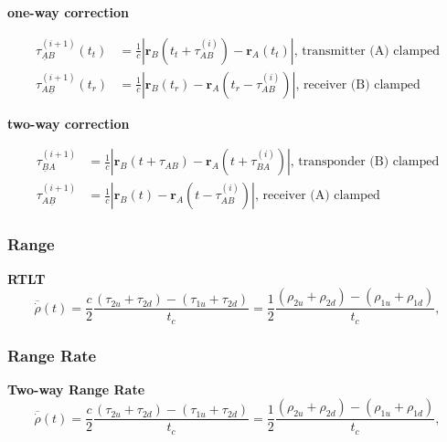 \textbf{one-way correction}

\begin{equation}
    \begin{aligned}
        \tau_{\underline{A}B}^{(i+1)}(t_t) &= \frac{1}{c}|\bm{r}_B(t_t+\tau_{AB}^{(i)})-\bm{r}_A(t_t)|\text{, transmitter (A) clamped} \\
        \tau_{A\underline{B}}^{(i+1)}(t_r) &= \frac{1}{c}|\bm{r}_B(t_r)-\bm{r}_A(t_r-\tau_{AB}^{(i)})|\text{, receiver (B) clamped}
    \end{aligned}
\end{equation}

\textbf{two-way correction}

\begin{equation}
    \begin{aligned}
        \tau_{\underline{B}A}^{(i+1)} &= \frac{1}{c}|\bm{r}_B(t+\tau_{AB})-\bm{r}_A(t+\tau_{BA}^{(i)})|\text{, transponder (B) clamped} \\
        \tau_{A\underline{B}}^{(i+1)} &= \frac{1}{c}|\bm{r}_B(t)-\bm{r}_A(t-\tau_{AB}^{(i)})|\text{, receiver (A) clamped}
    \end{aligned}
\end{equation}

\subsubsection{Range}

\textbf{RTLT}
\begin{equation}
    \overline{\dot{\rho}}(t) = \frac{c}{2}\frac{(\tau_{2u}+\tau_{2d})-(\tau_{1u}+\tau_{2d})}{t_c} = \frac{1}{2}\frac{(\rho_{2u}+\rho_{2d})-(\rho_{1u} + \rho_{1d})}{t_c},
\end{equation}


\subsubsection{Range Rate}

\textbf{Two-way Range Rate}
\begin{equation}
    \overline{\dot{\rho}}(t) = \frac{c}{2}\frac{(\tau_{2u}+\tau_{2d})-(\tau_{1u}+\tau_{2d})}{t_c} = \frac{1}{2}\frac{(\rho_{2u}+\rho_{2d})-(\rho_{1u} + \rho_{1d})}{t_c},
\end{equation}

